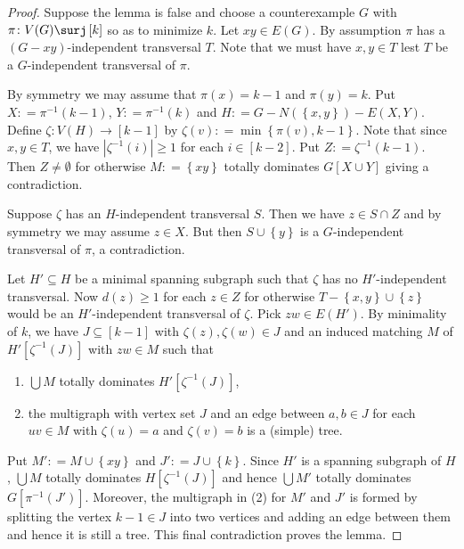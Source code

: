\documentclass[openany]{tufte-book} %
\theoremstyle{plain}
\newcommand{\set}[1]{\left\{ #1 \right\}}
\newcommand{\card}[1]{\left|#1\right|}
\newcommand{\func}[3]{#1\colon #2 \rightarrow #3}
\newcommand{\funcsurj}[3]{#1\colon #2 \surj #3}
\newcommand{\irange}[1]{\left[#1\right]}
\newcommand{\brackets}[1]{\left[ #1 \right]}
\newcommand{\DefinedAs}{\mathrel{\mathop:}=}
\begin{document}
\begin{proof}
Suppose the lemma is false and choose a counterexample $G$ with
$\funcsurj{\pi}{V(G)}{\irange{k}}$ so as to minimize $k$.  Let $xy \in E(G)$.
By assumption $\pi$ has a $(G-xy)$-independent transversal $T$.  Note that we
must have $x,y \in T$ lest $T$ be a $G$-independent transversal of $\pi$.

By symmetry we may assume that $\pi(x) = k-1$ and $\pi(y) = k$. Put $X
\DefinedAs \pi^{-1}(k-1)$, $Y \DefinedAs \pi^{-1}(k)$ and $H \DefinedAs G -
N(\set{x, y}) - E(X,Y)$. Define $\func{\zeta}{V(H)}{\irange{k-1}}$ by $\zeta(v)
\DefinedAs \min\set{\pi(v), k-1}$. Note that since $x,y \in T$, we have
$\card{\zeta^{-1}(i)} \geq 1$ for each $i \in \irange{k-2}$.  Put $Z \DefinedAs
\zeta^{-1}(k-1)$. Then $Z \neq \emptyset$ for otherwise $M \DefinedAs \set{xy}$
totally dominates $G[X \cup Y]$ giving a contradiction.

Suppose $\zeta$ has an $H$-independent transversal $S$.  Then we have $z \in S
\cap Z$ and by symmetry we may assume $z \in X$.  But then $S \cup \set{y}$ is
a $G$-independent transversal of $\pi$, a contradiction.

Let $H' \subseteq H$ be a minimal spanning subgraph such that $\zeta$ has no
$H'$-independent transversal.  Now $d(z) \geq 1$ for each $z \in Z$ for
otherwise $T - \set{x,y} \cup \set{z}$ would be an $H'$-independent transversal
of $\zeta$.  Pick $zw \in E(H')$.  By minimality of $k$, we have $J \subseteq
\irange{k-1}$ with $\zeta(z), \zeta(w) \in J$ and an induced matching $M$ of
$H'\brackets{\zeta^{-1}(J)}$ with $zw \in M$ such that
\begin{enumerate}
  \item $\bigcup M$ totally dominates $H'\brackets{\zeta^{-1}(J)}$,
  \item the multigraph with vertex set $J$ and an edge between $a, b \in J$ for
  each $uv \in M$ with $\zeta(u) = a$ and $\zeta(v) = b$ is a (simple) tree.
\end{enumerate}

Put $M' \DefinedAs M \cup \set{xy}$ and $J' \DefinedAs J \cup \set{k}$.
Since $H'$ is a spanning subgraph of $H$, $\bigcup M$ totally dominates
$H\brackets{\zeta^{-1}(J)}$ and hence $\bigcup M'$ totally dominates
$G\brackets{\pi^{-1}(J')}$.  Moreover, the multigraph in (2) for $M'$ and $J'$
is formed by splitting the vertex $k-1 \in J$ into two vertices and adding an edge
between them and hence it is still a tree.  This final contradiction proves the
lemma.
\end{proof}
\end{document}
